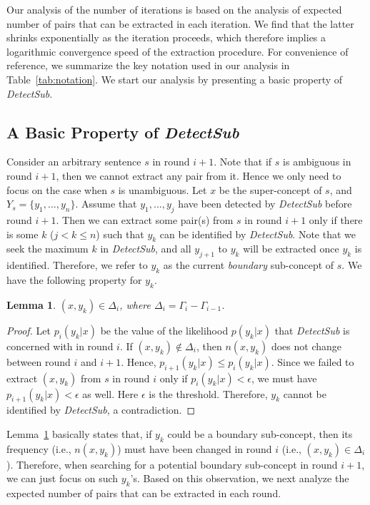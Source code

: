 \documentclass[10pt,journal,cspaper,compsoc]{IEEEtran}
\newtheorem{lemma}{Lemma}
\begin{document}
Our analysis of the number of iterations is based on the analysis of expected number of pairs that can be extracted in each iteration.
We find that the latter shrinks exponentially as the iteration proceeds, which therefore implies a logarithmic convergence speed of the extraction procedure.
For convenience of reference, we summarize the key notation used in our analysis in Table~\ref{tab:notation}.
We start our analysis by presenting a basic property of \emph{DetectSub}.

\subsection{A Basic Property of \emph{DetectSub}}

Consider an arbitrary sentence $s$ in round $i+1$. Note that if $s$ is ambiguous in round $i+1$, then we cannot extract any pair from it. Hence we only need to focus on the case when $s$ is unambiguous. Let $x$ be the super-concept of $s$, and $Y_s=\{y_1, ..., y_n\}$. Assume that $y_1,...,y_j$ have been detected by \emph{DetectSub} before round $i+1$. Then we can extract some pair(s) from $s$ in round $i+1$ only if there is some $k$ ($j<k\leq n$) such that $y_k$ can be identified by \emph{DetectSub}.
Note that we seek the maximum $k$ in \emph{DetectSub}, and all $y_{j+1}$ to $y_k$ will be extracted once $y_k$ is identified. Therefore, we refer to $y_k$ as the current \emph{boundary} sub-concept of $s$. We have the following property for $y_k$.

\begin{lemma}\label{lemma:yk}
$(x,y_k)\in\Delta_i$, where $\Delta_i=\Gamma_i-\Gamma_{i-1}$.
\end{lemma}

\begin{proof}
Let $p_i(y_k|x)$ be the value of the likelihood $p(y_k|x)$ that \emph{DetectSub} is concerned with in round $i$. If $(x,y_k)\not\in\Delta_i$, then $n(x,y_k)$ does not change between round $i$ and $i+1$. Hence, $p_{i+1}(y_k|x)\leq p_i(y_k|x)$. Since we failed to extract $(x,y_k)$ from $s$ in round $i$ only if $p_i(y_k|x)<\epsilon$, we must have $p_{i+1}(y_k|x)<\epsilon$ as well. Here $\epsilon$ is the threshold. Therefore, $y_k$ cannot be identified by \emph{DetectSub}, a contradiction.
\end{proof}

Lemma~\ref{lemma:yk} basically states that, if $y_k$ could be a boundary sub-concept, then its frequency (i.e., $n(x, y_k)$) must have been changed in round $i$ (i.e., $(x,y_k)\in\Delta_i$). Therefore, when searching for a potential boundary sub-concept in round $i+1$, we can just focus on such $y_k$'s.
Based on this observation, we next analyze the expected number of pairs that can be extracted in each round.
\end{document}
